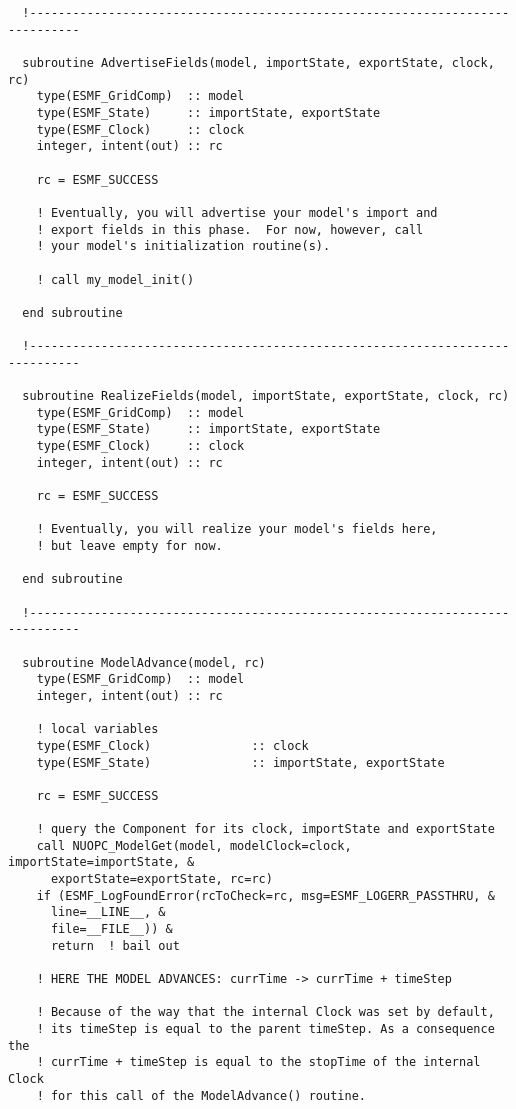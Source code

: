 \begin{verbatim}
  !-----------------------------------------------------------------------------

  subroutine AdvertiseFields(model, importState, exportState, clock, rc)
    type(ESMF_GridComp)  :: model
    type(ESMF_State)     :: importState, exportState
    type(ESMF_Clock)     :: clock
    integer, intent(out) :: rc
    
    rc = ESMF_SUCCESS 
    
    ! Eventually, you will advertise your model's import and
    ! export fields in this phase.  For now, however, call
    ! your model's initialization routine(s).
    
    ! call my_model_init()
    
  end subroutine
  
  !-----------------------------------------------------------------------------

  subroutine RealizeFields(model, importState, exportState, clock, rc)
    type(ESMF_GridComp)  :: model
    type(ESMF_State)     :: importState, exportState
    type(ESMF_Clock)     :: clock
    integer, intent(out) :: rc
    
    rc = ESMF_SUCCESS  
    
    ! Eventually, you will realize your model's fields here,
    ! but leave empty for now.

  end subroutine
  
  !-----------------------------------------------------------------------------

  subroutine ModelAdvance(model, rc)
    type(ESMF_GridComp)  :: model
    integer, intent(out) :: rc
    
    ! local variables
    type(ESMF_Clock)              :: clock
    type(ESMF_State)              :: importState, exportState

    rc = ESMF_SUCCESS
    
    ! query the Component for its clock, importState and exportState
    call NUOPC_ModelGet(model, modelClock=clock, importState=importState, &
      exportState=exportState, rc=rc)
    if (ESMF_LogFoundError(rcToCheck=rc, msg=ESMF_LOGERR_PASSTHRU, &
      line=__LINE__, &
      file=__FILE__)) &
      return  ! bail out

    ! HERE THE MODEL ADVANCES: currTime -> currTime + timeStep
    
    ! Because of the way that the internal Clock was set by default,
    ! its timeStep is equal to the parent timeStep. As a consequence the
    ! currTime + timeStep is equal to the stopTime of the internal Clock
    ! for this call of the ModelAdvance() routine.


\end{verbatim}
